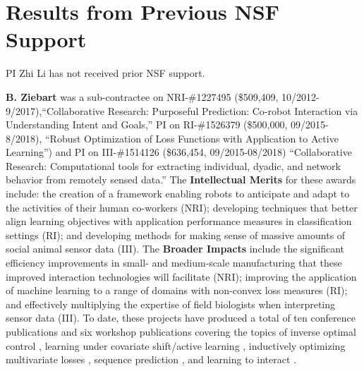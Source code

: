 \documentclass[letterpaper, 11 pt, onecolumn]{article}
\begin{document}

\section{Results from Previous NSF Support}\label{sec:priorNSF}

PI Zhi Li has not received prior NSF support.

\textbf{B. Ziebart} was a sub-contractee on NRI-\#1227495 (\$509,409,
10/2012-9/2017),``Collaborative Research:
Purposeful Prediction: Co-robot Interaction via Understanding Intent
and Goals,'' PI on RI-\#1526379 (\$500,000, 09/2015-8/2018),
``Robust Optimization of Loss Functions with Application to
Active Learning'') and PI on III-\#1514126 (\$636,454, 09/2015-08/2018)
``Collaborative Research: Computational tools for extracting individual,
dyadic, and network behavior from remotely sensed data.''
The {\bf Intellectual Merits} for these awards include: the
creation of a framework enabling robots to anticipate and adapt to the
activities of their human co-workers (NRI); developing techniques that
better align learning objectives with application performance measures
in classification settings (RI);
and developing methods for making sense of massive amounts of social animal
sensor data (III).
The {\bf Broader Impacts}
include the significant efficiency improvements in small- and
medium-scale manufacturing that these improved interaction technologies
will facilitate (NRI); improving the application of machine learning to a
range of domains with non-convex loss measures
(RI); and effectively multiplying the expertise
of field biologists when interpreting sensor data (III).
To date, these projects have produced
a total of ten conference publications and six workshop publications
covering the topics of
inverse optimal control \cite{asif2013inferring,monfort2013predictive,
byravan2014layered,monfort2015intent,chen2015predictive,
byravan2015graph,monfort2015softstar,chen2015imitation,chen2016adversarial},
learning under covariate shift/active learning
\cite{liu2014robust,liu2015shift,behpour2015addressing,chen2016robust},
inductively optimizing multivariate losses \cite{wang2015adversarial},
sequence prediction \cite{li2016adversarial}, and learning to interact
\cite{behpour2015minimax}.
\end{document}
